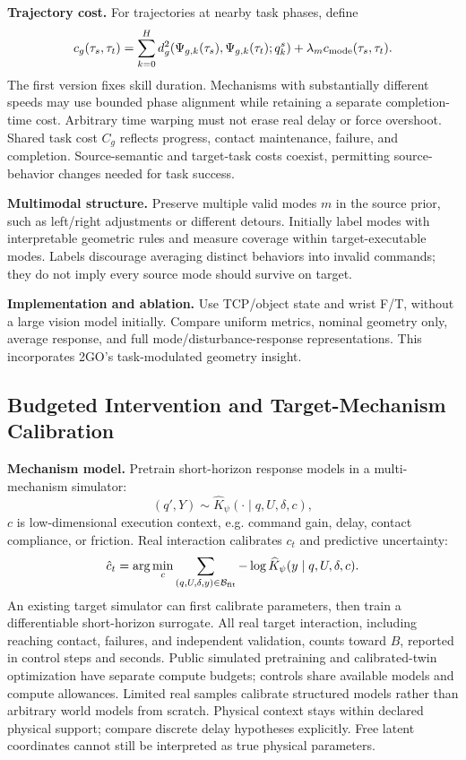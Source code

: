 \documentclass[11pt]{article}
\begin{document}
\textbf{Trajectory cost.} For trajectories at nearby task phases, define
\begin{equation}
 c_g(\tau_s,\tau_t)=
 \sum_{k=0}^{H}d_g^2(\Psi_{g,k}(\tau_s),\Psi_{g,k}(\tau_t);q_k^s)
 +\lambda_m c_{\rm mode}(\tau_s,\tau_t).
 \label{eq:semantic}
\end{equation}
The first version fixes skill duration. Mechanisms with substantially different speeds
may use bounded phase alignment while retaining a separate completion-time cost.
Arbitrary time warping must not erase real delay or force overshoot. Shared task cost
$C_g$ reflects progress, contact maintenance, failure, and completion. Source-semantic
and target-task costs coexist, permitting source-behavior changes needed for task success.

\textbf{Multimodal structure.} Preserve multiple valid modes $m$ in the source prior, such as left/right adjustments or different detours. Initially label modes with interpretable geometric rules and measure coverage within target-executable modes. Labels discourage averaging distinct behaviors into invalid commands; they do not imply every source mode should survive on target.

\textbf{Implementation and ablation.} Use TCP/object state and wrist F/T, without a large vision model initially. Compare uniform metrics, nominal geometry only, average response, and full mode/disturbance-response representations. This incorporates 2GO's task-modulated geometry insight.

\subsection{Budgeted Intervention and Target-Mechanism Calibration}
\label{sec:calibration}
\textbf{Mechanism model.} Pretrain short-horizon response models in a multi-mechanism simulator:
\begin{equation}
 (q',Y)\sim\widehat K_\psi(\cdot\mid q,U,\delta,c),
 \label{eq:model}
\end{equation}
$c$ is low-dimensional execution context, e.g. command gain, delay, contact compliance,
or friction. Real interaction calibrates $c_t$ and predictive uncertainty:
\begin{equation}
 \hat c_t=\arg\min_c
 \sum_{(q,U,\delta,y)\in\mathcal B_{\rm fit}}
 -\log\widehat K_\psi(y\mid q,U,\delta,c).
 \label{eq:calibrate}
\end{equation}
An existing target simulator can first calibrate parameters, then train a differentiable
short-horizon surrogate. All real target interaction, including reaching contact,
failures, and independent validation, counts toward $B$, reported in control steps
and seconds. Public simulated pretraining and calibrated-twin optimization have separate
compute budgets; controls share available models and compute allowances. Limited real
samples calibrate structured models rather than arbitrary world models from scratch.
Physical context stays within declared physical support; compare discrete delay hypotheses
explicitly. Free latent coordinates cannot still be interpreted as true physical parameters.
\end{document}
